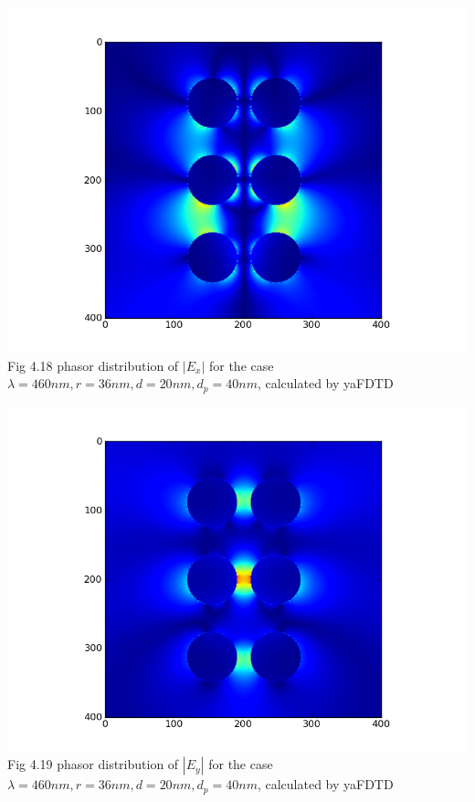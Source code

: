 \documentclass[openany]{book}
\begin{document}
\begin{center}
\includegraphics[scale=0.8]{images/ex-d40.png}\\
Fig 4.18
phasor distribution of $|E_x|$ for the case $\lambda = 460nm, r = 36nm, d = 20nm, d_p = 40nm$, calculated by yaFDTD
\end{center}

\begin{center}
\includegraphics[scale=0.8]{images/ey-d40.png}\\
Fig 4.19
phasor distribution of $|E_y|$ for the case $\lambda = 460nm, r = 36nm, d = 20nm, d_p = 40nm$, calculated by yaFDTD
\end{center}
\end{document}
